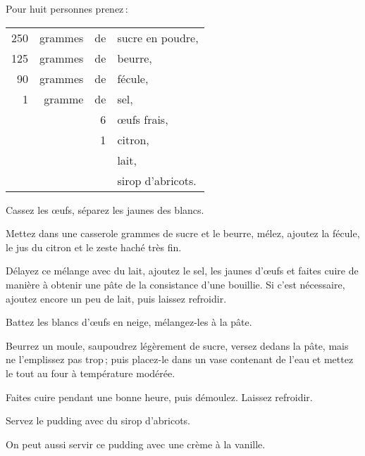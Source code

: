 Pour huit personnes prenez :

\footnotesize
\begin{longtable}{rrrp{16em}}
    250 & grammes & de & sucre en poudre,                                                                 \\
    125 & grammes & de & beurre,                                                                          \\
     90 & grammes & de & fécule,                                                                          \\
      1 & gramme  & de & sel,                                                                             \\
        &         &  6 & œufs frais,                                                                      \\
        &         &  1 & citron,                                                                          \\
        &         &    & lait,                                                                            \\
        &         &    & sirop d'abricots.                                                                \\
\end{longtable}
\normalsize

Cassez les œufs, séparez les jaunes des blancs.

Mettez dans une casserole {\mmm} grammes de sucre et le beurre, mélez,
ajoutez la fécule, le jus du citron et le zeste haché très fin.

Délayez ce mélange avec du lait, ajoutez le sel, les jaunes d'œufs et faites
cuire de manière à obtenir une pâte de la consistance d'une bouillie. Si c'est
nécessaire, ajoutez encore un peu de lait, puis laissez refroidir.

Battez les blancs d'œufs en neige, mélangez-les à la pâte.

Beurrez un moule, saupoudrez légèrement de sucre, versez dedans la pâte, mais
ne l’emplissez pas trop ; puis placez-le dans un vase contenant de l'eau et
mettez le tout au four à température modérée.

Faites cuire pendant une bonne heure, puis démoulez. Laissez refroidir.

Servez le pudding avec du sirop d'abricots.

\sk

On peut aussi servir ce pudding avec une crème à la vanille.

